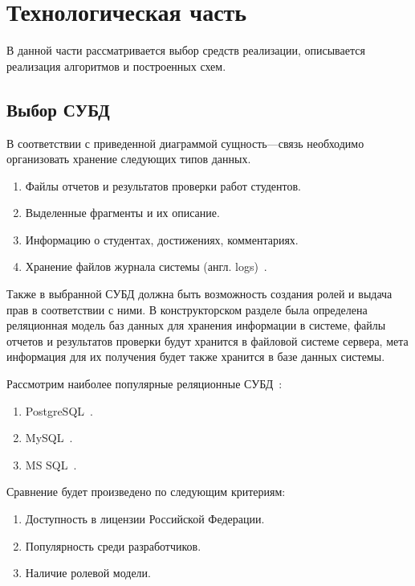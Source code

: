 \chapter{Технологическая часть}
В данной части рассматривается выбор средств реализации, описывается реализация алгоритмов и построенных схем.

\section{Выбор СУБД}
В соответствии с приведенной диаграммой сущность---связь необходимо организовать хранение следующих типов данных.
\begin{enumerate}
	\item Файлы отчетов и результатов проверки работ студентов.
	\item Выделенные фрагменты и их описание.
	\item Информацию о студентах, достижениях, комментариях.
	\item Хранение файлов журнала системы (англ. logs)~\cite{kuznecov-db}.
\end{enumerate}
Также в выбранной СУБД должна быть возможность создания ролей и выдача прав в соответствии с ними.
В конструкторском разделе была определена реляционная модель баз данных для хранения информации в системе, файлы отчетов и результатов проверки будут хранится в файловой системе сервера, мета информация для их получения будет также хранится в базе данных системы.

Рассмотрим наиболее популярные реляционные СУБД~\cite{sql_popular}:
\begin{enumerate}
	\item PostgreSQL~\cite{postgres,postgres_pro_cert}.
	\item MySQL~\cite{ms_sql_server}.
	\item MS SQL~\cite{mysql}.
\end{enumerate}

Сравнение будет произведено по следующим критериям:
\begin{enumerate}
	\item Доступность в лицензии Российской Федерации.
	\item Популярность среди разработчиков.
	\item Наличие ролевой модели.
\end{enumerate}


